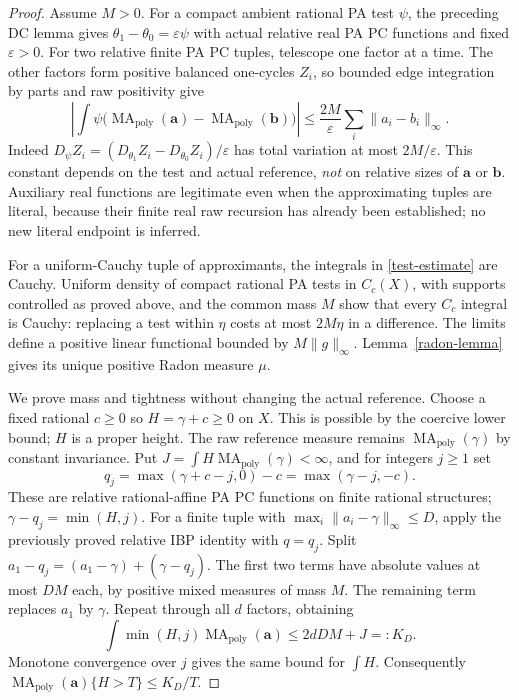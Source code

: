\documentclass[11pt]{article}
\newcommand{\MA}{\operatorname{MA}_{\mathrm{poly}}}
\begin{document}
\begin{proof}
Assume $M>0$. For a compact ambient rational PA test $\psi$, the preceding
DC lemma gives $\theta_1-\theta_0=\varepsilon\psi$ with actual relative
real PA PC functions and fixed $\varepsilon>0$. For two relative finite
PA PC tuples, telescope one factor at a time. The other factors form
positive balanced one-cycles $Z_i$, so bounded edge integration by parts
and raw positivity give
\begin{equation}\label{test-estimate}
 \left|\int\psi\bigl(\MA(\mathbf a)-\MA(\mathbf b)\bigr)\right|
 \leq \frac{2M}{\varepsilon}\sum_i\|a_i-b_i\|_\infty.
\end{equation}
Indeed $D_\psi Z_i=(D_{\theta_1}Z_i-D_{\theta_0}Z_i)/\varepsilon$
has total variation at most $2M/\varepsilon$. This constant depends on
the test and actual reference, \emph{not} on relative sizes of $\mathbf a$
or $\mathbf b$. Auxiliary real functions are legitimate even when the
approximating tuples are literal, because their finite real raw recursion
has already been established; no new literal endpoint is inferred.

For a uniform-Cauchy tuple of approximants, the integrals in
\eqref{test-estimate} are Cauchy. Uniform density of compact rational PA
tests in $C_c(X)$, with supports controlled as proved above, and the
common mass $M$ show that every $C_c$ integral is Cauchy: replacing a test
within $\eta$ costs at most $2M\eta$ in a difference. The limits define
a positive linear functional bounded by $M\|g\|_\infty$.
Lemma~\ref{radon-lemma} gives its unique positive Radon measure $\mu$.

We prove mass and tightness without changing the actual reference.
Choose a fixed rational $c\geq0$ so $H=\gamma+c\geq0$ on $X$.
This is possible by the coercive lower bound; $H$ is a proper height.
The raw reference measure remains $\MA(\gamma)$ by constant invariance.
Put $J=\int H\MA(\gamma)<\infty$, and for integers $j\geq1$ set
\[
 q_j=\max(\gamma+c-j,0)-c=\max(\gamma-j,-c).
\]
These are relative rational-affine PA PC functions on finite rational
structures; $\gamma-q_j=\min(H,j)$.
For a finite tuple with $\max_i\|a_i-\gamma\|_\infty\leq D$,
apply the previously proved relative IBP identity with $q=q_j$.
Split $a_1-q_j=(a_1-\gamma)+(\gamma-q_j)$.
The first two terms have absolute values at most $DM$ each, by positive
mixed measures of mass $M$. The remaining term replaces $a_1$ by
$\gamma$. Repeat through all $d$ factors, obtaining
\begin{equation}\label{moment}
 \int\min(H,j)\MA(\mathbf a)\leq2dDM+J=:K_D.
\end{equation}
Monotone convergence over $j$ gives the same bound for $\int H$.
Consequently $\MA(\mathbf a)\{H>T\}\leq K_D/T$.


\end{proof}
\end{document}

